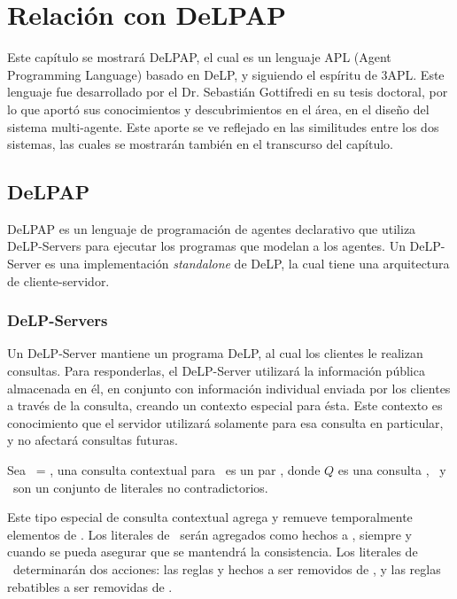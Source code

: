
\chapter{Relación con DeLPAP}

Este capítulo se mostrará DeLPAP, el cual es un lenguaje APL (Agent Programming 
Language) basado en DeLP, y siguiendo el espíritu de 3APL. Este lenguaje fue
desarrollado por el Dr. Sebastián Gottifredi en su tesis doctoral, por lo que 
aportó sus conocimientos y descubrimientos en el área, en el diseño del sistema
multi-agente. Este aporte se ve reflejado en las similitudes entre los dos 
sistemas, las cuales se mostrarán también en el transcurso del capítulo.

\section{DeLPAP}

DeLPAP es un lenguaje de programación de agentes declarativo que utiliza 
DeLP-Servers para ejecutar los programas que modelan a los agentes. Un 
DeLP-Server es una implementación \textit{standalone} de DeLP, la cual 
tiene una arquitectura de cliente-servidor. 

\subsection{DeLP-Servers}
Un DeLP-Server mantiene un programa DeLP, al cual los clientes le realizan consultas. 
Para responderlas, el DeLP-Server utilizará la información pública almacenada 
en él, en conjunto con información individual enviada por los clientes a 
través de la consulta, creando un contexto especial para ésta. Este contexto 
es conocimiento que el servidor utilizará solamente para esa consulta en particular, y no afectará consultas futuras.

\begin{definicion}
Sea \PP\ = \SD, una consulta contextual para \PP\ es un par 
, donde $Q$ es una consulta \DLP, \addset\ y 
\remset\ son un conjunto de literales no contradictorios.
\end{definicion}

Este tipo especial de consulta contextual agrega y remueve temporalmente
elementos de \PP. Los literales de \addset\ serán agregados como hechos a 
\SSet, siempre y cuando se pueda asegurar que se mantendrá la consistencia.
Los literales de \remset\ determinarán dos acciones: las reglas y hechos a ser 
removidos de \SSet, y las reglas rebatibles a ser removidas de \DD.


